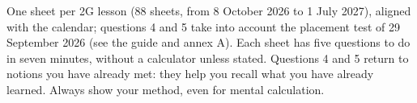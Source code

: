 \begin{note}
\ifmxteacher
  One sheet per 2G lesson (88 sheets, from 8 October 2026 to 1 July 2027), aligned with the calendar;
  questions 4 and 5 take into account the placement test of 29 September 2026 (see the guide and annex A).
\else
  Each sheet has five questions to do in seven minutes, without a calculator unless stated.
  Questions 4 and 5 return to notions you have already met: they help you recall what you have already learned.
  Always show your method, even for mental calculation.
\fi
\end{note}
\tableofcontents
\bigskip
